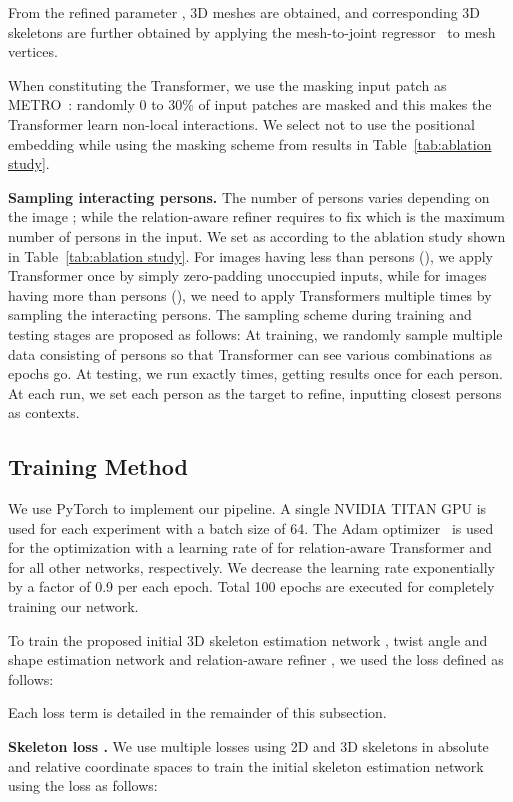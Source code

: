 \documentclass[runningheads]{llncs}
\begin{document}
From the refined parameter , 3D meshes  are obtained, and corresponding 3D skeletons  are further obtained by applying the mesh-to-joint regressor~\cite{smpl} to mesh vertices. 

When constituting the Transformer, we use the masking input patch as METRO~\cite{lin2021end}: randomly 0 to 30\% of input patches are masked and this makes the Transformer learn non-local interactions. We select not to use the positional embedding while using the masking scheme from results in Table~\ref{tab:ablation study}.

\noindent \textbf{Sampling interacting persons.}\label{method:choose-person} The number of persons  varies depending on the image ; while the relation-aware refiner  requires to fix  which is the maximum number of persons in the input. We set  as  according to the ablation study shown in Table~\ref{tab:ablation study}. For images having less than  persons (), we apply Transformer once by simply zero-padding unoccupied inputs, while for images having more than  persons (), we need to apply Transformers multiple times by sampling the interacting persons. The sampling scheme during training and testing stages are proposed as follows: At training, we randomly sample multiple data consisting of  persons so that Transformer can see various combinations as epochs go. At testing, we run  exactly  times, getting results once for each person. At each run, we set each person as the target to refine, inputting  closest persons as contexts.

\subsection{Training Method}

We use PyTorch to implement our pipeline. A single NVIDIA TITAN GPU is used for each experiment with a batch size of 64. The Adam optimizer~\cite{kingma2014adam} is used for the optimization with a learning rate of  for relation-aware Transformer and  for all other networks, respectively. We decrease the learning rate exponentially by a factor of 0.9 per each epoch. Total 100 epochs are executed for completely training our network.

To train the proposed initial 3D skeleton estimation network , twist angle and shape estimation network  and relation-aware refiner , we used the loss  defined as follows:

Each loss term is detailed in the remainder of this subsection.

\noindent \textbf{Skeleton loss .} We use multiple  losses using 2D and 3D skeletons in absolute and relative coordinate spaces to train the initial skeleton estimation network  using the loss  as follows:
\end{document}
